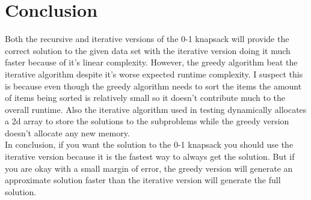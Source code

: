 \documentclass[a4paper]{article}
\begin{document}
    \section{Conclusion}
    Both the recursive and iterative versions of the 0-1 knapsack will provide the 
    correct solution to the given data set with the iterative version doing it much
    faster because of it's linear complexity. However, the greedy algorithm beat 
    the iterative algorithm despite it's worse expected runtime complexity. I suspect
    this is because even though the greedy algorithm needs to sort the items the 
    amount of items being sorted is relatively small so it doesn't contribute much
    to the overall runtime. Also the iterative algorithm used in testing dynamically
    allocates a 2d array to store the solutions to the subproblems while the greedy 
    version doesn't allocate any new memory. \\

    In conclusion, if you want the solution to the 0-1 knapsack you should use the 
    iterative version because it is the fastest way to always get the solution. But 
    if you are okay with a small margin of error, the greedy version will generate 
    an approximate solution faster than the iterative version will generate the full
    solution.
\end{document}
